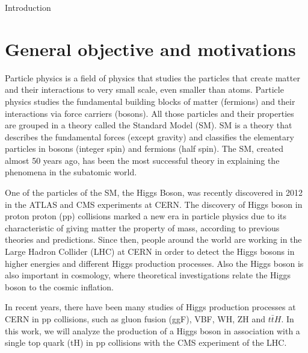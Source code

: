 
\begin{chapter}{Introduction}

\section{General objective and motivations}

Particle physics is a field of physics that studies the particles that create matter and their interactions to very small scale, even smaller than atoms. 
Particle physics studies the fundamental building blocks of matter (fermions) and their interactions via force carriers (bosons). 
All those particles and their properties are grouped in a theory called the Standard Model (SM). SM is a theory that describes the fundamental forces (except gravity) and classifies the elementary particles in bosons (integer spin) and fermions (half spin).
The SM, created almost 50 years ago, has been the most successful theory in explaining the phenomena in the subatomic world.

One of the particles of the SM, the Higgs Boson, was recently discovered in 2012 in the ATLAS and CMS experiments at CERN. The discovery of Higgs boson in proton proton (pp) collisions marked a new era in particle physics due to its characteristic of giving matter the property of mass, according to previous theories and predictions. Since then, people around the world are working in the Large Hadron Collider (LHC) at CERN in order to detect the Higgs bosons in higher energies and different Higgs production processes. 
Also the Higgs boson is also important in cosmology, where theoretical investigations relate the Higgs boson to the cosmic inflation.

In recent years, there have been many studies of Higgs production processes at CERN in pp collisions, such as gluon fusion (ggF), VBF, WH, ZH and $t\bar{t}H$. 
In this work, we will analyze the production of a Higgs boson in association with a
single top quark (tH) in pp collisions with the CMS experiment of the LHC. 


\end{chapter}
